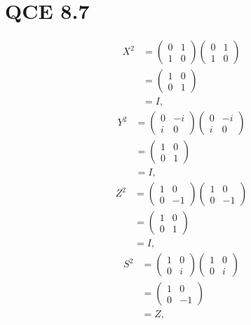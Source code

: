 \documentclass[10pt]{article}
\begin{document}
\section*{QCE 8.7}
\begin{align*}
X^2 &= 
\begin{pmatrix}
0 & 1 \\
1 & 0 
\end{pmatrix}
\begin{pmatrix}
0 & 1 \\
1 & 0 
\end{pmatrix} \\
&=
\begin{pmatrix}
1 & 0 \\
0 & 1
\end{pmatrix} \\
&= I,
\end{align*}
\begin{align*}
Y^2 &= 
\begin{pmatrix}
0 & -i \\
i  & 0
\end{pmatrix}
\begin{pmatrix}
0 & -i \\
i  & 0
\end{pmatrix} \\
&=
\begin{pmatrix}
1 & 0 \\
0 & 1
\end{pmatrix} \\
&= I,
\end{align*}
\begin{align*}
Z^2 &= 
\begin{pmatrix}
1 &  0 \\
0  & -1
\end{pmatrix}
\begin{pmatrix}
1 & 0 \\
0 & -1
\end{pmatrix} \\
&=
\begin{pmatrix}
1 & 0 \\
0 & 1
\end{pmatrix} \\
&= I,
\end{align*}
\begin{align*}
S^2 &= 
\begin{pmatrix}
1 &  0 \\
0  & i
\end{pmatrix}
\begin{pmatrix}
1 & 0 \\
0 & i
\end{pmatrix} \\
&=
\begin{pmatrix}
1 & 0 \\
0 & -1
\end{pmatrix} \\
&= Z,
\end{align*}
\end{document}
